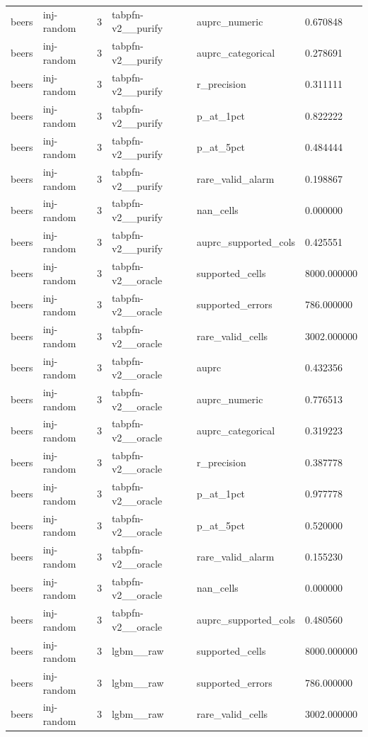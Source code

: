 \begin{tabular}{llllll}
beers & inj-random & 3 & tabpfn-v2\_\_purify & auprc\_numeric & 0.670848 \\
beers & inj-random & 3 & tabpfn-v2\_\_purify & auprc\_categorical & 0.278691 \\
beers & inj-random & 3 & tabpfn-v2\_\_purify & r\_precision & 0.311111 \\
beers & inj-random & 3 & tabpfn-v2\_\_purify & p\_at\_1pct & 0.822222 \\
beers & inj-random & 3 & tabpfn-v2\_\_purify & p\_at\_5pct & 0.484444 \\
beers & inj-random & 3 & tabpfn-v2\_\_purify & rare\_valid\_alarm & 0.198867 \\
beers & inj-random & 3 & tabpfn-v2\_\_purify & nan\_cells & 0.000000 \\
beers & inj-random & 3 & tabpfn-v2\_\_purify & auprc\_supported\_cols & 0.425551 \\
beers & inj-random & 3 & tabpfn-v2\_\_oracle & supported\_cells & 8000.000000 \\
beers & inj-random & 3 & tabpfn-v2\_\_oracle & supported\_errors & 786.000000 \\
beers & inj-random & 3 & tabpfn-v2\_\_oracle & rare\_valid\_cells & 3002.000000 \\
beers & inj-random & 3 & tabpfn-v2\_\_oracle & auprc & 0.432356 \\
beers & inj-random & 3 & tabpfn-v2\_\_oracle & auprc\_numeric & 0.776513 \\
beers & inj-random & 3 & tabpfn-v2\_\_oracle & auprc\_categorical & 0.319223 \\
beers & inj-random & 3 & tabpfn-v2\_\_oracle & r\_precision & 0.387778 \\
beers & inj-random & 3 & tabpfn-v2\_\_oracle & p\_at\_1pct & 0.977778 \\
beers & inj-random & 3 & tabpfn-v2\_\_oracle & p\_at\_5pct & 0.520000 \\
beers & inj-random & 3 & tabpfn-v2\_\_oracle & rare\_valid\_alarm & 0.155230 \\
beers & inj-random & 3 & tabpfn-v2\_\_oracle & nan\_cells & 0.000000 \\
beers & inj-random & 3 & tabpfn-v2\_\_oracle & auprc\_supported\_cols & 0.480560 \\
beers & inj-random & 3 & lgbm\_\_raw & supported\_cells & 8000.000000 \\
beers & inj-random & 3 & lgbm\_\_raw & supported\_errors & 786.000000 \\
beers & inj-random & 3 & lgbm\_\_raw & rare\_valid\_cells & 3002.000000 \\

\end{tabular}
